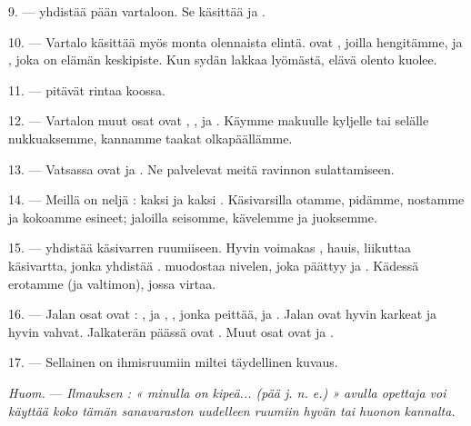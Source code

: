 \VUsaut{4.4mm}
\VUsaut{3.0mm}

9. ---  yhdistää pään vartaloon. Se käsittää  ja
.

10. --- Vartalo käsittää myös monta olennaista elintä.  ovat
, joilla hengitämme, ja , joka on elämän
keskipiste. Kun sydän lakkaa lyömästä, elävä olento kuolee.

11. ---  pitävät rintaa koossa.

12. --- Vartalon muut osat ovat , ,
 ja . Käymme makuulle kyljelle tai selälle
nukkuaksemme, kannamme taakat olkapäällämme.

13. --- Vatsassa ovat  ja . Ne palvelevat meitä
ravinnon sulattamiseen.

\VUsaut{4.4mm}
\VUsaut{3.0mm}

14. --- Meillä on neljä  : kaksi  ja kaksi
. Käsivarsilla otamme, pidämme, nostamme ja kokoamme esineet;
jaloilla seisomme, kävelemme ja juoksemme.

15. ---  yhdistää käsivarren ruumiiseen. Hyvin voimakas
, hauis, liikuttaa käsivartta, jonka  yhdistää
.  muodostaa  nivelen, joka
päättyy  ja . Kädessä erotamme
 (ja valtimon), jossa  virtaa.

16. --- Jalan osat ovat : ,  ja
, , jonka   peittää,
 ja . Jalan  ovat hyvin karkeat ja
hyvin vahvat. Jalkaterän päässä ovat . Muut osat ovat
 ja .

17. --- Sellainen on ihmisruumiin miltei täydellinen kuvaus.

\textit{Huom.} --- \textit{Ilmauksen : « minulla on kipeä... (pää j. n. e.) »
avulla opettaja voi käyttää koko tämän sanavaraston uudelleen ruumiin hyvän tai
huonon}  \textit{kannalta.}

\VUsaut{5.0mm}
\VUsaut{2.4mm}
\VUsaut{3.0mm}

